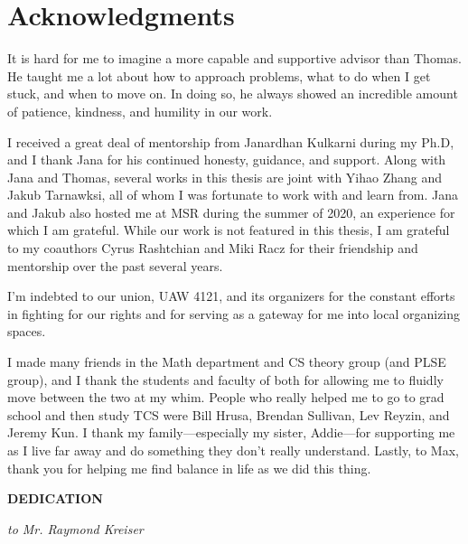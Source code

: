 \documentclass[12pt]{book}
\theoremstyle{theorem}
\theoremstyle{remark}
\theoremstyle{definition}
\theoremstyle{plain}
\theoremstyle{plain}
\theoremstyle{plain}
\theoremstyle{definition}
\theoremstyle{theorem}
\begin{document}
\begin{spacing}{1.5}
  \tableofcontents
\end{spacing}

\chapter*{Acknowledgments}


It is hard for me to imagine a more capable and supportive advisor than Thomas. 
He taught me a lot about how to approach problems, what to do when I get stuck, and when to move on.
In doing so, he always showed an incredible amount of patience, kindness, and humility in our work. 

I received a great deal of mentorship from Janardhan Kulkarni during my Ph.D, and I thank Jana for his continued 
honesty, guidance, and support.
Along with Jana and Thomas, several works in this thesis are joint with Yihao Zhang and Jakub Tarnawksi, all of whom I was fortunate to work with and learn from.
Jana and Jakub also hosted me at MSR during the summer of 2020, an experience for which I am grateful.
While our work is not featured in this thesis, I am grateful to my coauthors Cyrus Rashtchian and Miki Racz 
for their friendship and mentorship over the past several years.

I'm indebted to our union, UAW 4121, and its organizers for the constant efforts in fighting for our rights 
and for serving as a gateway for me into local organizing spaces.


I made many friends in the Math department and CS theory group (and PLSE group), and I thank the students and faculty of both 
for allowing me to fluidly move between the two at my whim. 
People who really helped me to go to grad school and then study TCS were
Bill Hrusa, Brendan Sullivan, Lev Reyzin, and Jeremy Kun.
I thank my family---especially my sister, Addie---for supporting me as I live far away and do something they don't really understand.
Lastly, to Max, thank you for helping me find balance in life as we did this thing.
\clearpage


\begin{center}
    \textbf{DEDICATION}


\emph{to Mr. Raymond Kreiser}


\end{center}




\clearpage

\pagestyle{headings}
\setcounter{page}{1}
\renewcommand{\chaptermark}[1]{\markboth{\sc{\chaptername\ \thechapter.\ #1}}{}}
\renewcommand{\sectionmark}[1]{\markright{\sc{\thesection.\ #1}}{}}





\clearpage
{}
\singlespacing


\end{document}
